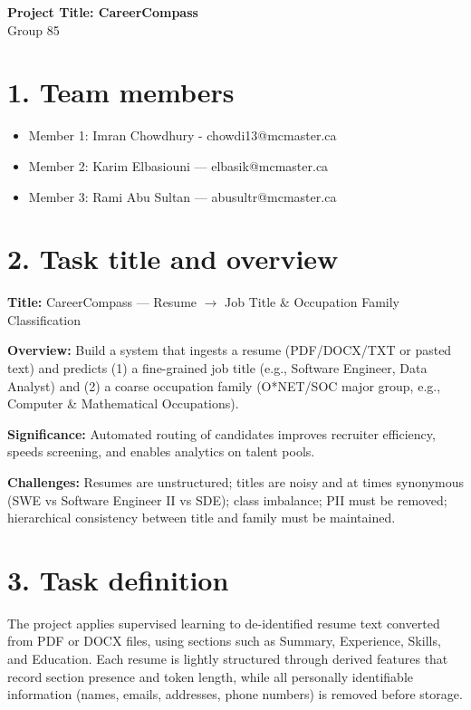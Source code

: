 \documentclass[12pt]{article}
\begin{document}
\begin{center}
  {\Large\bfseries Project Title: CareerCompass}\\[8pt]
  {\normalsize Group 85}
\end{center}

\section*{1. Team members}
\begin{itemize}
  \item Member 1: Imran Chowdhury - chowdi13@mcmaster.ca
  \item Member 2: Karim Elbasiouni — elbasik@mcmaster.ca
  \item Member 3: Rami Abu Sultan — abusultr@mcmaster.ca
\end{itemize}

\section*{2. Task title and overview}
\noindent\textbf{Title:} CareerCompass — Resume $\rightarrow$ Job Title \& Occupation Family Classification

\noindent\textbf{Overview:} Build a system that ingests a resume (PDF/DOCX/TXT or pasted text) and predicts (1) a fine-grained job title (e.g., Software Engineer, Data Analyst) and (2) a coarse occupation family (O*NET/SOC major group, e.g., Computer \& Mathematical Occupations).

\noindent\textbf{Significance:} Automated routing of candidates improves recruiter efficiency, speeds screening, and enables analytics on talent pools. 

\noindent\textbf{Challenges:} Resumes are unstructured; titles are noisy and at times synonymous (SWE vs Software Engineer II vs SDE); class imbalance; PII must be removed; hierarchical consistency between title and family must be maintained.

\section*{3. Task definition}
\noindent The project applies supervised learning to de-identified resume text converted from PDF or DOCX files, using sections such as Summary, Experience, Skills, and Education. Each resume is lightly structured through derived features that record section presence and token length, while all personally identifiable information (names, emails, addresses, phone numbers) is removed before storage.
\end{document}
